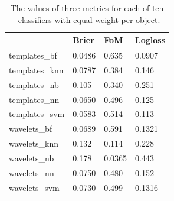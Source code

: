 \begin{table}[]
\begin{tabular}{llll}
& Brier   & FoM   & Logloss            \\
\hline
templates\_bf  						 & 0.0486  & 0.635  & 0.0907  \\
templates\_knn             & 0.0787  & 0.384 & 0.146  \\
templates\_nb              & 0.105  & 0.340  & 0.251 \\
templates\_nn							 & 0.0650  & 0.496   & 0.125 \\
templates\_svm             & 0.0583 & 0.514  & 0.113 \\
wavelets\_bf   						 & 0.0689  & 0.591  & 0.1321 \\
wavelets\_knn              & 0.132  & 0.114 & 0.228 \\
wavelets\_nb               & 0.178  & 0.0365 & 0.443  \\
wavelets\_nn 							 & 0.0750  & 0.480  & 0.152 \\
wavelets\_svm              & 0.0730  & 0.499  & 0.1316 \\
\end{tabular}
\caption{The values of three metrics for each of ten \snmachine\ classifiers with equal weight per object.}
	\label{tab:snmachinevals}
\end{table}

